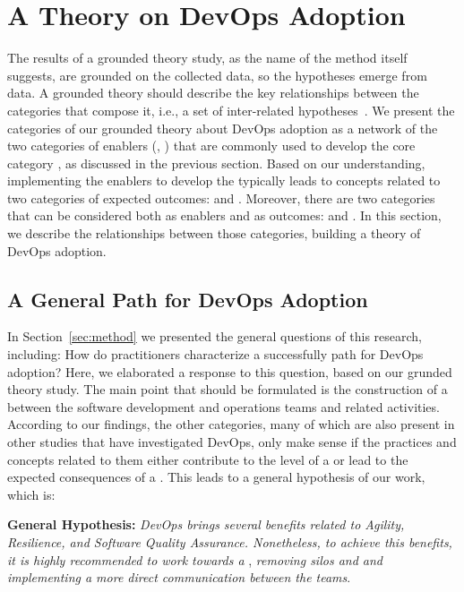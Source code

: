 \section{A Theory on DevOps Adoption} \label{sec:results}

The results of a grounded theory study, as the name of the method itself
suggests, are grounded on the collected data, so the hypotheses emerge from
data. A grounded theory should describe the key relationships between the
categories that compose it, i.e., a set of inter-related hypotheses~\cite{hoda2017becoming}.
We present the categories of our grounded theory
about DevOps adoption as a network of the two categories of enablers (,
) that are commonly used to develop the core category
\cc, as discussed in the previous section. Based on our understanding,
implementing the enablers to develop the \cc typically leads
to concepts related to two categories of expected outcomes:
 and . Moreover, there are two categories that can be considered
both as enablers and as outcomes:  and .
In this section, we describe the relationships between those categories, building a theory
of DevOps adoption.

\subsection{A General Path for DevOps Adoption}

In Section~\ref{sec:method} we presented the general questions of this
research, including: How do practitioners characterize a successfully path
   for DevOps adoption? Here, we elaborated a response to this question,
based on our grunded theory study. The main
point that should be formulated is the construction of a  between the software development and operations teams and
related activities. According to our findings, the other categories,
many of which are also present in other studies that have investigated DevOps,
only make sense if the practices and concepts related to them either contribute
to the level of a \cc or lead to the expected consequences
of a \cc. {\color{blue}This leads to a general hypothesis of our work, which is:}

\begin{mh}
  {\bf General Hypothesis:} \textit{DevOps brings several benefits
  related to Agility, Resilience, and Software Quality
  Assurance. Nonetheless, to achieve this benefits,
  it is highly recommended to work towards a} \cc,
  \textit{removing silos and and implementing a more direct
  communication between the teams}. 
\end{mh}

